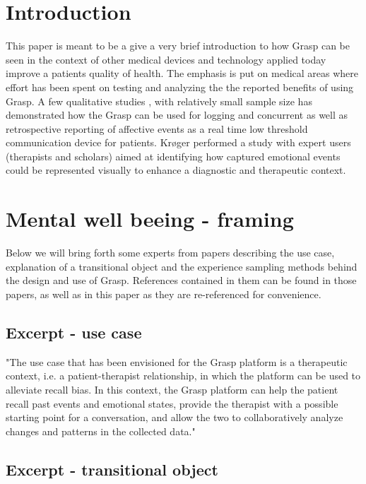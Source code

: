\section{Introduction}
This paper is meant to be a give a very brief introduction to how Grasp can be seen in the context of other medical devices and technology applied today improve a patients quality of health. The emphasis is put on medical areas  where effort has been spent on testing and analyzing the the reported benefits of using Grasp. A few qualitative studies \cite{Guribye:2018:TID:3173225.3173287}, \cite{guribye2016}  with relatively small sample size has demonstrated how the Grasp can be used for logging and concurrent as well as retrospective reporting of affective events as a real time low threshold communication device for patients. Krøger \cite{kroger2015logging} performed a study with expert users (therapists and scholars) aimed at identifying how captured emotional events could be represented visually to enhance a diagnostic and therapeutic context.

\section{Mental well beeing - framing}
Below we will bring forth some experts from papers describing the use case, explanation of a transitional object and the experience sampling methods behind the design and use of Grasp. References contained in them can be found in those papers, as well as in this paper as they are re-referenced for convenience.

\subsection{Excerpt - use case }

"The use case that has been envisioned for the Grasp platform is a therapeutic context, i.e. a patient-therapist relationship, in which the platform can be used to alleviate recall bias. In this context, the Grasp platform can help the patient recall past events and emotional states, provide the therapist with a possible starting point for a conversation, and allow the two to collaboratively analyze changes and patterns in the collected data." \cite[p.~7]{guribye2016}

\subsection{Excerpt - transitional object }

